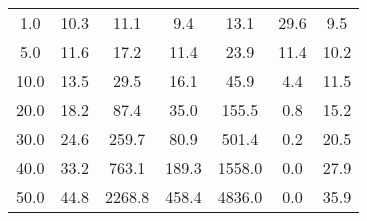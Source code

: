 \begin{tabular}{c | c | c | c | c | c | c}
1.0 & 10.3 & 11.1 & 9.4 & 13.1 & 29.6 & 9.5 \\
5.0 & 11.6 & 17.2 & 11.4 & 23.9 & 11.4 & 10.2 \\
10.0 & 13.5 & 29.5 & 16.1 & 45.9 & 4.4 & 11.5 \\
20.0 & 18.2 & 87.4 & 35.0 & 155.5 & 0.8 & 15.2 \\
30.0 & 24.6 & 259.7 & 80.9 & 501.4 & 0.2 & 20.5 \\
40.0 & 33.2 & 763.1 & 189.3 & 1558.0 & 0.0 & 27.9 \\
50.0 & 44.8 & 2268.8 & 458.4 & 4836.0 & 0.0 & 35.9 \\
\end{tabular}